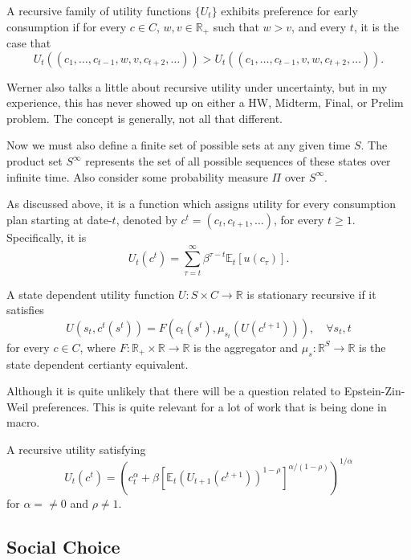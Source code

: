 \documentclass[11pt,english]{article}
\begin{document}
\begin{definition}
A recursive family of utility functions $\{U_t\}$ exhibits preference for early consumption if for every $c\in C$, $w,v\in \mathbb{R}_+$ such that $w>v$, and every $t$, it is the case that $$U_t((c_1, \ldots, c_{t-1}, w, v, c_{t+2}, \ldots)) > U_t((c_1, \ldots, c_{t-1}, v, w, c_{t+2}, \ldots)).$$
\end{definition}
Werner also talks a little about recursive utility under uncertainty, but in my experience, this has never showed up on either a HW, Midterm, Final, or Prelim problem. The concept is generally, not all that different.

Now we must also define a finite set of possible sets at any given time $S$. The product set $S^\infty$ represents the set of all possible sequences of these states over infinite time. Also consider some probability measure $\Pi$ over $S^\infty$. 
\begin{definition}
As discussed above, it is a function which assigns utility for every consumption plan starting at date-$t$, denoted by $c^t = (c_t, c_{t+1}, \ldots)$, for every $t\geq 1$. Specifically, it is $$U_t(c^t) = \sum_{\tau = t}^\infty \beta^{\tau - t}\mathbb{E}_t[u(c_\tau)].$$
\end{definition}

\begin{definition}
A state dependent utility function $U:S\times C\to \mathbb{R}$ is stationary recursive if it satisfies $$U(s_t, c^t(s^t)) = F(c_t(s^t), \mu_{s_t}(U(c^{t+1}))), \quad \forall s_t, t$$for every $c\in C$, where $F:\mathbb{R}_+\times \mathbb{R}\to \mathbb{R}$ is the aggregator and $\mu_s:\mathbb{R}^S \to \mathbb{R}$ is the state dependent certianty equivalent.
\end{definition}

Although it is quite unlikely that there will be a question related to Epstein-Zin-Weil preferences. This is quite relevant for a lot of work that is being done in macro. 
\begin{definition}
A recursive utility satisfying $$U_t(c^t) = \left(c_t^\alpha + \beta[\mathbb{E}_t(U_{t+1}(c^{t+1}))^{1 - \rho}]^{\alpha / (1 - \rho)}\right)^{1/\alpha}$$ for $\alpha =\neq 0$ and $\rho \neq 1$.
\end{definition}
\subsection{Social Choice}
\end{document}
